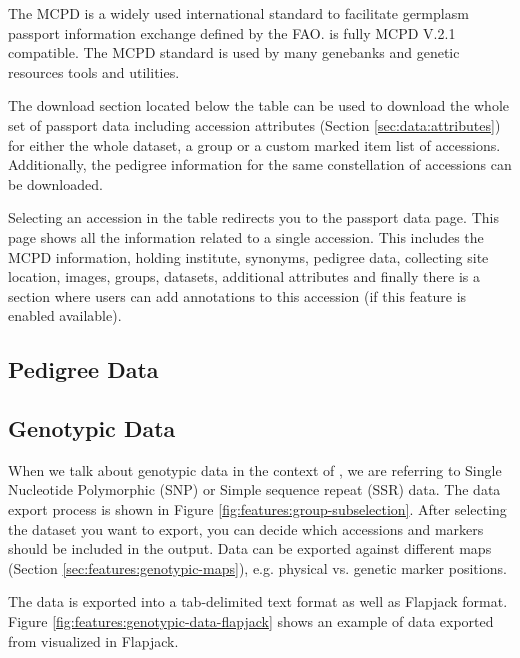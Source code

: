The MCPD is a widely used international standard to facilitate germplasm passport information exchange defined by the FAO. {\germinate} is fully MCPD V.2.1 compatible. The MCPD standard is used by many genebanks and genetic resources tools and utilities.

The download section located below the table can be used to download the whole set of passport data including accession attributes (\cf Section \ref{sec:data:attributes}) for either the whole dataset, a group or a custom marked item list of accessions. Additionally, the pedigree information for the same constellation of accessions can be downloaded.

Selecting an accession in the table redirects you to the passport data page. This page shows all the information related to a single accession. This includes the MCPD information, holding institute, synonyms, pedigree data, collecting site location, images, groups, datasets, additional attributes and finally there is a section where users can add annotations to this accession (if this feature is enabled available).

\subsection{Pedigree Data}
\label{sec:data:pedigree}

\subsection{Genotypic Data}
When we talk about genotypic data in the context of {\germinate}, we are referring to Single Nucleotide Polymorphic (SNP) or Simple sequence repeat (SSR) data. The data export process is shown in Figure \ref{fig:features:group-subselection}. After selecting the dataset you want to export, you can decide which accessions and markers should be included in the output. Data can be exported against different maps (\cf Section \ref{sec:features:genotypic-maps}), e.g. physical vs. genetic marker positions.

The data is exported into a tab-delimited text format as well as Flapjack \cite{flapjack} format. Figure \ref{fig:features:genotypic-data-flapjack} shows an example of data exported from {\germinate} visualized in Flapjack.

